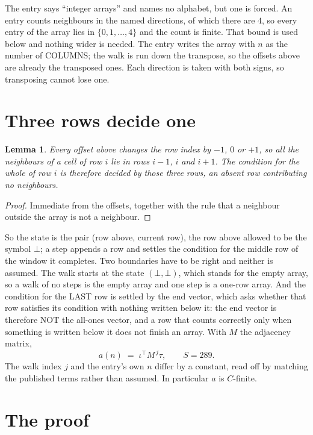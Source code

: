 \documentclass[11pt,a4paper]{article}
\theoremstyle{plain}
\newtheorem{lemma}[theorem]{Lemma}
\theoremstyle{definition}
\begin{document}
The entry says ``integer arrays'' and names no alphabet, but one is forced. An entry counts
neighbours in the named directions, of which there are $4$, so every entry of the array
lies in $\{0,1,\dots,4\}$ and the count is finite. That bound is used below and
nothing wider is needed. The entry writes the array with $n$ as the number of COLUMNS; the walk is run down the transpose, so the offsets above are already the transposed ones. Each direction is taken with both signs, so transposing cannot lose one.

\section{Three rows decide one}

\begin{lemma}\label{lem:win}
Every offset above changes the row index by $-1$, $0$ or $+1$, so all the neighbours of a cell
of row $i$ lie in rows $i-1$, $i$ and $i+1$. The condition for the whole of row $i$ is
therefore decided by those three rows, an absent row contributing no neighbours.
\end{lemma}

\begin{proof}
Immediate from the offsets, together with the rule that a neighbour outside the array is not a
neighbour.
\end{proof}

So the state is the pair (row above, current row), the row above allowed to be the symbol
$\bot$; a step appends a row and settles the condition for the middle row of the window it
completes. Two boundaries have to be right and neither is assumed. The walk starts at the state
$(\bot,\bot)$, which stands for the empty array, so a walk of no steps is the empty array and
one step is a one-row array. And the condition for the LAST row is settled by the end vector,
which asks whether that row satisfies its condition with nothing written below it: the end
vector is therefore NOT the all-ones vector, and a row that counts correctly only when
something is written below it does not finish an array. With $M$ the adjacency matrix,
\[
a(n)\;=\;\iota^{\!\top}M^{\,j}\tau ,\qquad S=289.
\]
The walk index $j$ and the entry's own $n$ differ by a constant, read off by matching the
published terms rather than assumed. In particular $a$ is $C$-finite.

\section{The proof}
\end{document}
